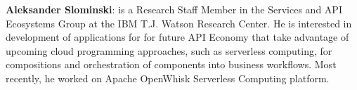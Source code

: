 \documentclass[conference]{IEEEtran}
\begin{document}
\smallbreak

{\noindent \bf Aleksander Slominski}: is a Research Staff Member in the Services and API Ecosystems Group at the IBM T.J. Watson Research Center. He is interested in development of applications for for future API Economy that take advantage of upcoming cloud programming approaches, such as serverless computing, for compositions and orchestration of components into business workflows. Most recently, he worked on Apache OpenWhisk Serverless Computing platform.

\nocite{*}




%


\end{document}
